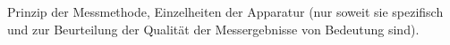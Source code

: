 Prinzip der Messmethode, Einzelheiten der Apparatur (nur soweit sie spezifisch und zur Beurteilung der Qualit\"at der Messergebnisse von Bedeutung sind).